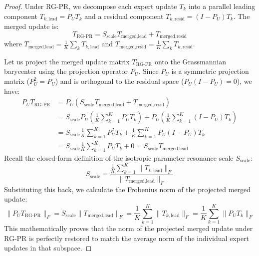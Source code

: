 \documentclass{article}
\theoremstyle{plain}
\theoremstyle{definition}
\theoremstyle{remark}
\begin{document}
\begin{proof}
Under RG-PR, we decompose each expert update $T_k$ into a parallel leading component $T_{k, \text{lead}} = P_U T_k$ and a residual component $T_{k, \text{resid}} = (I - P_U) T_k$. The merged update is:
\begin{equation}
T_{\text{RG-PR}} = S_{\text{scale}} T_{\text{merged}, \text{lead}} + T_{\text{merged}, \text{resid}}
\end{equation}
where $T_{\text{merged}, \text{lead}} = \frac{1}{K} \sum_k T_{k, \text{lead}}$ and $T_{\text{merged}, \text{resid}} = \frac{1}{K} \sum_k T_{k, \text{resid}}$.

Let us project the merged update matrix $T_{\text{RG-PR}}$ onto the Grassmannian barycenter using the projection operator $P_U$. Since $P_U$ is a symmetric projection matrix ($P_U^2 = P_U$) and is orthogonal to the residual space ($P_U (I - P_U) = 0$), we have:
\begin{align}
P_U T_{\text{RG-PR}} &= P_U \left( S_{\text{scale}} T_{\text{merged}, \text{lead}} + T_{\text{merged}, \text{resid}} \right) \\
&= S_{\text{scale}} P_U \left( \frac{1}{K} \sum_{k=1}^K P_U T_k \right) + P_U \left( \frac{1}{K} \sum_{k=1}^K (I - P_U) T_k \right) \\
&= S_{\text{scale}} \frac{1}{K} \sum_{k=1}^K P_U^2 T_k + \frac{1}{K} \sum_{k=1}^K P_U(I - P_U) T_k \\
&= S_{\text{scale}} \frac{1}{K} \sum_{k=1}^K P_U T_k + 0 = S_{\text{scale}} T_{\text{merged}, \text{lead}}
\end{align}
Recall the closed-form definition of the isotropic parameter resonance scale $S_{\text{scale}}$:
\begin{equation}
S_{\text{scale}} = \frac{\frac{1}{K} \sum_{k=1}^K \| T_{k, \text{lead}} \|_F}{\| T_{\text{merged}, \text{lead}} \|_F}
\end{equation}
Substituting this back, we calculate the Frobenius norm of the projected merged update:
\begin{equation}
\| P_U T_{\text{RG-PR}} \|_F = S_{\text{scale}} \| T_{\text{merged}, \text{lead}} \|_F = \frac{1}{K} \sum_{k=1}^K \| T_{k, \text{lead}} \|_F = \frac{1}{K} \sum_{k=1}^K \| P_U T_k \|_F
\end{equation}
This mathematically proves that the norm of the projected merged update under RG-PR is perfectly restored to match the average norm of the individual expert updates in that subspace.


\end{proof}
\end{document}
